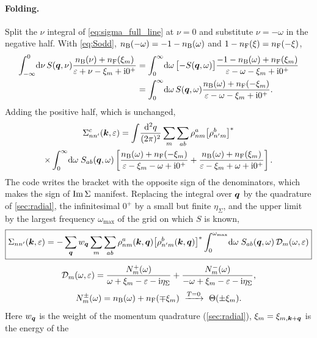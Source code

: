 \paragraph{Folding.} Split the $\nu$ integral of \cref{eq:sigma_full_line} at $\nu=0$ and substitute $\nu=-\omega$ in the negative
half. With \cref{eq:Sodd}, $n_{\rm B}(-\omega)=-1-n_{\rm B}(\omega)$ and $1-n_{\rm F}(\xi)=n_{\rm F}(-\xi)$,
\begin{align}
\int_{-\infty}^0\!\mathrm d\nu\,S(\bm q,\nu)\frac{n_{\rm B}(\nu)+n_{\rm F}(\xi_m)}{\varepsilon+\nu-\xi_m+\mathrm i0^+}
&=\int_0^\infty\!\mathrm d\omega\,\bigl[-S(\bm q,\omega)\bigr]\frac{-1-n_{\rm B}(\omega)+n_{\rm F}(\xi_m)}{\varepsilon-\omega-\xi_m+\mathrm i0^+}\nonumber\\
&=\int_0^\infty\!\mathrm d\omega\,S(\bm q,\omega)\frac{n_{\rm B}(\omega)+n_{\rm F}(-\xi_m)}{\varepsilon-\omega-\xi_m+\mathrm i0^+} .
\end{align}
Adding the positive half, which is unchanged,
\begin{multline}
\Sigma^c_{nn'}(\bm k,\varepsilon)=\int\!\frac{\mathrm d^2q}{(2\pi)^2}\sum_m\sum_{ab}\rho^a_{nm}\bigl[\rho^b_{n'm}\bigr]^*\\
\times\int_0^\infty\!\mathrm d\omega\;S_{ab}(\bm q,\omega)\left[\frac{n_{\rm B}(\omega)+n_{\rm F}(-\xi_m)}{\varepsilon-\xi_m-\omega+\mathrm i0^+}
+\frac{n_{\rm B}(\omega)+n_{\rm F}(\xi_m)}{\varepsilon-\xi_m+\omega+\mathrm i0^+}\right].
\label{eq:sigma_folded}
\end{multline}
The code writes the bracket with the opposite sign of the denominators, which makes the sign of $\operatorname{Im}\Sigma$ manifest.
Replacing the integral over $\bm q$ by the quadrature of \cref{sec:radial}, the infinitesimal $0^+$ by a small but finite
$\eta_\Sigma$, and the upper limit by the largest frequency $\omega_{\max}$ of the grid on which $S$ is known,
\begin{equation}
\boxed{\Sigma_{nn'}(\bm k,\varepsilon)=-\sum_{\bm q}w_{\bm q}\sum_m\sum_{ab}\rho^a_{nm}(\bm k,\bm q)\bigl[\rho^b_{n'm}(\bm k,\bm q)\bigr]^*
\int_0^{\omega_{\max}}\!\mathrm d\omega\;S_{ab}(\bm q,\omega)\,\mathcal D_m(\omega,\varepsilon)}
\label{eq:sigma}
\end{equation}
\begin{equation}
\mathcal D_m(\omega,\varepsilon)=\frac{N^+_m(\omega)}{\omega+\xi_m-\varepsilon-\mathrm i\eta_\Sigma}+\frac{N^-_m(\omega)}{-\omega+\xi_m-\varepsilon-\mathrm i\eta_\Sigma},
\label{eq:D}
\end{equation}
\begin{equation}
N^\pm_m(\omega)=\nB(\omega)+\nF(\mp\xi_m)\ \xrightarrow{T=0}\ \Theta(\pm\xi_m).
\label{eq:Npm}
\end{equation}
Here $w_{\bm q}$ is the weight of the momentum quadrature (\cref{sec:radial}), $\xi_m=\xi_{m,\bm k+\bm q}$ is the energy of the
